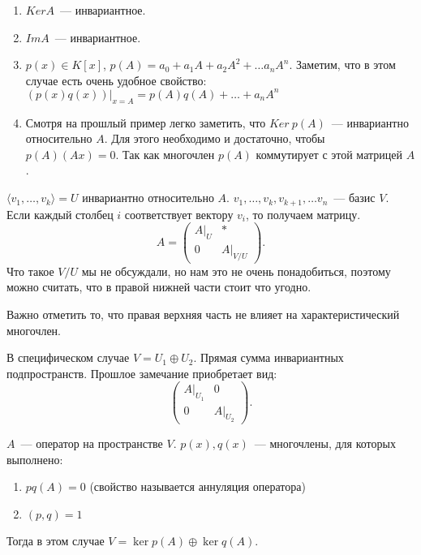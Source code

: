 \begin{examples}
    \begin{enumerate}
        \item
            $Ker A$~--- инвариантное.
        \item
             $Im A$~--- инвариантное.
         \item
             $p(x)\in K[x]$, $p(A) = a_0 + a_1 A + a_2 A^2 + \dots a_n A^n$.
             Заметим, что в этом случае есть очень удобное свойство:
             $(p(x)q(x))|_{x = A} = p(A)q(A) + \dots + a_n A^n$
         \item Смотря на прошлый пример легко заметить, что $Ker\ p(A)$~--- инвариантно относительно $A$.
             Для этого необходимо и достаточно, чтобы $p(A)(Ax) = 0$.
             Так как многочлен $p(A)$ коммутирует с этой матрицей $A$.

     \end{enumerate}
\end{examples}
\begin{remark}
    $\langle v_1,\dots, v_k\rangle = U$ инвариантно относительно $A$. $v_1,\dots, v_k, v_{k + 1},\dots v_n$~--- базис $V$.
    Если каждый столбец $i$ соответствует вектору $v_i$, то получаем матрицу.
    \[
        A = 
        \left(\begin{array}{c|c}
                A|_U & *\\
                \hline
                0 & A|_{V/U}
        \end{array}\right)
    .\] 
    Что такое $V/U$ мы не обсуждали, но нам это не очень понадобиться, поэтому можно считать, что в правой нижней части стоит что
    угодно. 
    
    Важно отметить то, что правая верхняя часть не влияет на характеристический многочлен.
\end{remark}
\begin{remark}
    В специфическом случае
    $V = U_1 \oplus U_2$. Прямая сумма инвариантных подпространств. Прошлое замечание приобретает вид:
     \[
         \left(\begin{array}{c|c}
                 A|_{U_1} & 0\\
                 \hline
                 0 & A|_{U_2}
         \end{array}\right)
    .\] 
\end{remark}
\begin{theorem}
    $A$~--- оператор на пространстве $V$. $p(x), q(x)$~--- многочлены, для которых выполнено: 
     \begin{enumerate}
         \item $pq(A) = 0$ (свойство называется аннуляция оператора)
         \item $(p, q) = 1$
    \end{enumerate}
    Тогда в этом случае $V = \ker p(A) \oplus \ker q(A)$.
\end{theorem}
